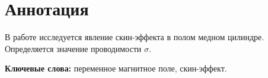 \section*{Аннотация}

В работе исследуется явление скин-эффекта в полом медном цилиндре. Определяется значение проводимости $\sigma$.

\textbf{Ключевые слова:} переменное магнитное поле, скин-эффект.